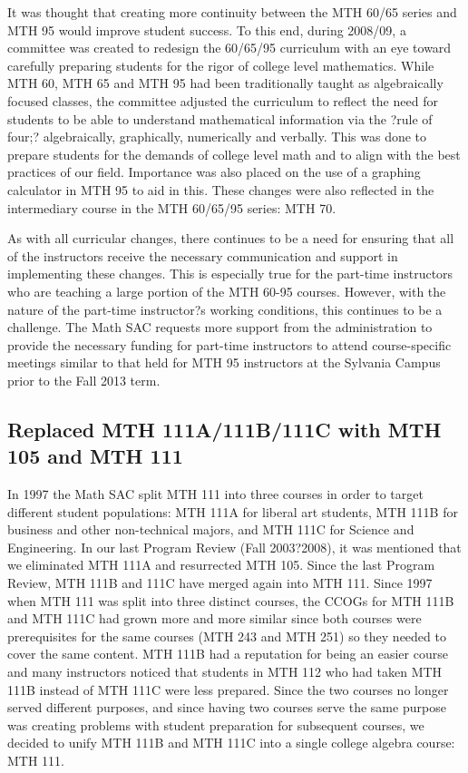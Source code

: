 It was thought that creating more continuity between the MTH 60/65 series and
MTH 95 would improve student success.  To this end, during 2008/09, a committee
was created to redesign the 60/65/95 curriculum with an eye toward carefully
preparing students for the rigor of college level mathematics.  While MTH 60,
MTH 65 and MTH 95 had been traditionally taught as algebraically focused
classes, the committee adjusted the curriculum to reflect the need for students
to be able to understand mathematical information via the ?rule of four;?
algebraically, graphically, numerically and verbally.  This was done to prepare
students for the demands of college level math and to align with the best
practices of our field.  Importance was also placed on the use of a graphing
calculator in MTH 95 to aid in this.  These changes were also reflected in the
intermediary course in the MTH 60/65/95 series: MTH 70.
 
As with all curricular changes, there continues to be a need for ensuring that
all of the instructors receive the necessary communication and support in
implementing these changes.  This is especially true for the part-time
instructors who are teaching a large portion of the MTH 60-95 courses.  However,
with the nature of the part-time instructor?s working conditions, this continues
to be a challenge.  The Math SAC requests more support from the administration
to provide the necessary funding for part-time instructors to attend
course-specific meetings similar to that held for MTH 95 instructors at the
Sylvania Campus prior to the Fall 2013 term.
 
\subsection{Replaced MTH 111A/111B/111C with MTH 105 and MTH 111}
In 1997 the Math SAC split MTH 111 into three courses in order to target
different student populations: MTH 111A for liberal art students, MTH 111B for
business and other non-technical majors, and MTH 111C for Science and
Engineering.  In our last Program Review (Fall 2003?2008), it was mentioned that
we eliminated MTH 111A and resurrected MTH 105.  Since the last Program Review,
MTH 111B and 111C have merged again into MTH 111.  Since 1997 when MTH 111 was
split into three distinct courses, the CCOGs for MTH 111B and MTH 111C had grown
more and more similar since both courses were prerequisites for the same courses
(MTH 243 and MTH 251) so they needed to cover the same content.  MTH 111B had a
reputation for being an easier course and many instructors noticed that students
in MTH 112 who had taken MTH 111B instead of MTH 111C were less prepared.  Since
the two courses no longer served different purposes, and since having two
courses serve the same purpose was creating problems with student preparation
for subsequent courses, we decided to unify MTH 111B and MTH 111C into a single
college algebra course: MTH 111.
 
